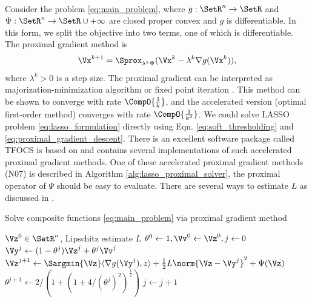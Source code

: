 \documentclass[
10pt, %
a4paper, %
oneside, %
headinclude,footinclude, %
BCOR5mm, %
]{scrartcl}
\begin{document}
\paragraph{}
Consider the problem \eqref{eq:main_problem}, where $g:  \SetR^n \to \SetR $ and 
$\Psi: \SetR^n \to \SetR \cup {+\infty}$ are 
closed proper convex and $g$ is differentiable. In this form, we split the 
objective into two terms, one of which is differentiable. The proximal gradient 
method is
\begin{align} \label{eq:proximal_gradient_descent}
	\Vx^{k+1} = \Sprox_{\lambda^k \Psi}(\Vx^k - \lambda^k \nabla g(\Vx^k)), 
\end{align}
where $ \lambda^k > 0 $ is a step size. The proximal gradient can be interpreted 
as majorization-minimization algorithm or fixed point iteration 
\cite{parikh2013proximal}.  This method can be shown to converge with rate 
$ \CompO{ \frac{1}{k} } $, and the accelerated version \cite{beck2009fast} 
(optimal first-order method) converges with rate $ \CompO{ \frac{1}{k^2} } $. 
We could solve LASSO problem \eqref{eq:lasso_formulation} directly using 
Eqn. \eqref{eq:soft_thresholding} and \eqref{eq:proximal_gradient_descent}. 
There is an excellent software package called TFOCS \cite{becker2012tfocs} is 
based on and contains several implementations of such accelerated proximal 
gradient methods. One of these accelerated proximal gradient methods 
(N07\cite{nesterov2007gradient}) is described in Algorithm 
\ref{alg:lasso_proximal_solver}, the proximal operator of $ \Psi $ should be 
easy to evaluate. There are several ways to estimate $L$ as discussed in 
\cite{becker2012tfocs}.

\begin{algorithm}[ht]
	\caption{Solve composite functions \eqref{eq:main_problem} via proximal 
gradient method}
\label{alg:lasso_proximal_solver}
\begin{algorithmic}[1]
	\Require $ \Vz^0 \in \SetR^n $, Lipschitz estimate $ L $
	\State $\theta^0 \gets 1, \Vv^0 \gets \Vz^0, j \gets 0 $
	\Repeat
	\State $ \Vy^j\gets 
	(1-\theta^j)\Vz^j + \theta^j \Vv^j $
	\State  $ \Vz^{j+1} \gets \Sargmin{\Vz} \langle \nabla g(\Vy^j), z \rangle 
	+ \frac{1}{2} L \norm{ \Vz - \Vy^j }^2 + \Psi(\Vz) $
	\State $ \theta^{j+1} \gets 2/(1+(1+4/(\theta^{j})^2)^{\frac{1}{2}})$
	\State $ j \gets j + 1 $
\end{algorithmic}
\end{algorithm}
\end{document}
